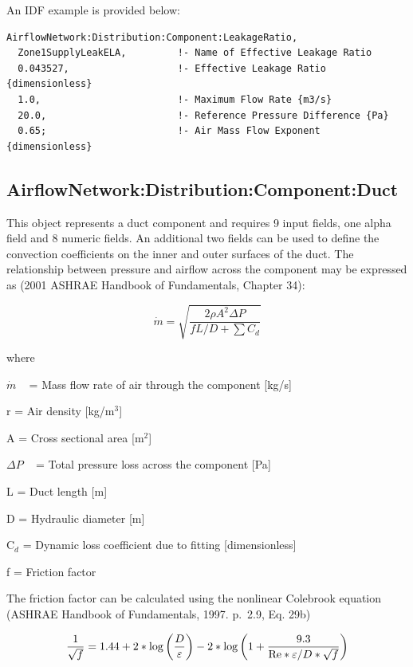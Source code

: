 An IDF example is provided below:

\begin{lstlisting}
AirflowNetwork:Distribution:Component:LeakageRatio,
  Zone1SupplyLeakELA,         !- Name of Effective Leakage Ratio
  0.043527,                   !- Effective Leakage Ratio {dimensionless}
  1.0,                        !- Maximum Flow Rate {m3/s}
  20.0,                       !- Reference Pressure Difference {Pa}
  0.65;                       !- Air Mass Flow Exponent {dimensionless}
\end{lstlisting}

\subsection{AirflowNetwork:Distribution:Component:Duct}\label{airflownetworkdistributioncomponentduct}

This object represents a duct component and requires 9 input fields, one alpha field and 8 numeric fields. An additional two fields can be used to define the convection coefficients on the inner and outer surfaces of the duct. The relationship between pressure and airflow across the component may be expressed as (2001 ASHRAE Handbook of Fundamentals, Chapter 34):

\begin{equation}
\dot m = \sqrt {\frac{{2\rho {A^2}\Delta P}}{{fL/D + \sum {C_d}}}}
\end{equation}

where

\(\dot m\) ~ = Mass flow rate of air through the component {[}kg/s{]}

r = Air density {[}kg/m\(^{3}\){]}

A = Cross sectional area {[}m\(^{2}\){]}

\(\Delta P\) ~ = Total pressure loss across the component {[}Pa{]}

L = Duct length {[}m{]}

D = Hydraulic diameter {[}m{]}

C\(_{d}\) = Dynamic loss coefficient due to fitting {[}dimensionless{]}

f = Friction factor

The friction factor can be calculated using the nonlinear Colebrook equation (ASHRAE Handbook of Fundamentals, 1997. p.~2.9, Eq. 29b)

\begin{equation}
\frac{1}{{\sqrt f }} = 1.44 + 2*\log \left( {\frac{D}{\varepsilon }} \right) - 2*\log \left( {1 + \frac{{9.3}}{{{\mathop{\rm Re}\nolimits} *\varepsilon /D*\sqrt f }}} \right)
\end{equation}

